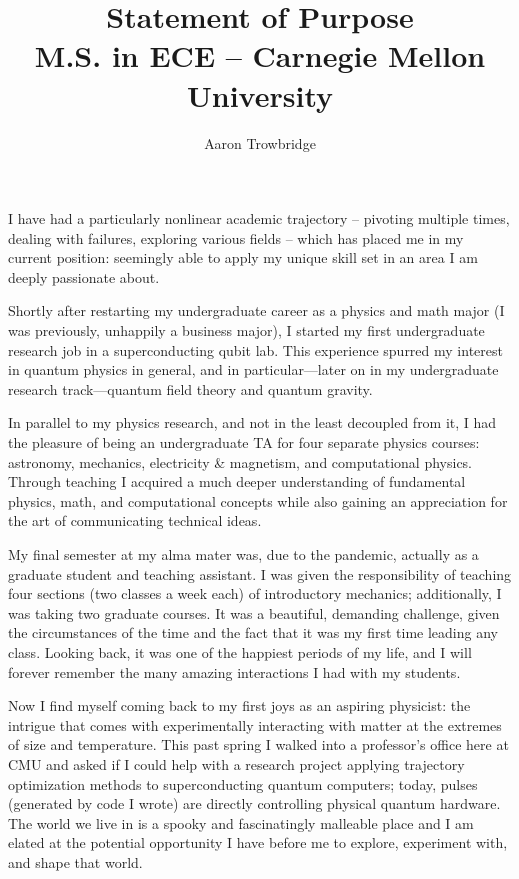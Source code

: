 \documentclass{article}
\title{\huge Statement of Purpose \\[1.5ex] \Large M.S. in ECE -- Carnegie Mellon University}
\author{Aaron Trowbridge}
\date{}
\begin{document}
\maketitle

I have had a particularly nonlinear academic trajectory -- pivoting multiple times, dealing with failures, exploring various fields -- which has placed me in my current position: seemingly able to apply my unique skill set in an area I am deeply passionate about. 

Shortly after restarting my undergraduate career as a physics and math major (I was previously, unhappily a business major), I started my first undergraduate research job in a superconducting qubit lab.  This experience spurred my interest in quantum physics in general, and in particular---later on in my undergraduate research track---quantum field theory and quantum gravity.   

In parallel to my physics research, and not in the least decoupled from it, I had the pleasure of being an undergraduate TA for four separate physics courses: astronomy, mechanics, electricity \& magnetism, and computational physics.  Through teaching I acquired a much deeper understanding of fundamental physics, math, and computational concepts while also gaining an appreciation for the art of communicating technical ideas.

My final semester at my alma mater was, due to the pandemic, actually as a graduate student and teaching assistant.  I was given the responsibility of teaching four sections (two classes a week each) of introductory mechanics; additionally, I was taking two graduate courses.  It was a beautiful, demanding challenge, given the circumstances of the time and the fact that it was my first time leading any class.  Looking back, it was one of the happiest periods of my life, and I will forever remember the many amazing interactions I had with my students.

Now I find myself coming back to my first joys as an aspiring physicist: the intrigue that comes with experimentally interacting with matter at the extremes of size and temperature.  This past spring I walked into a professor's office here at CMU and asked if I could help with a research project applying trajectory optimization methods to superconducting quantum computers; today, pulses (generated by code I wrote) are directly controlling physical quantum hardware. The world we live in is a spooky and fascinatingly malleable place and I am elated at the potential opportunity I have before me to explore, experiment with, and shape that world. 
\end{document}
